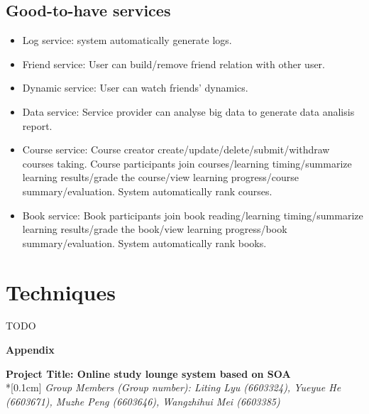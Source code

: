\documentclass[runningheads]{llncs}
\begin{document}
\subsection*{Good-to-have services}
\begin{itemize}
    \item Log service: system automatically generate logs.
    \item Friend service: User can build/remove friend relation with other user.
    \item Dynamic service: User can watch friends' dynamics.
    \item Data service: Service provider can analyse big data to generate data analisis report.
    \item Course service: Course creator create/update/delete/submit/withdraw courses taking. Course participants join courses/learning timing/summarize learning results/grade the course/view learning progress/course summary/evaluation. System automatically rank courses.
    \item Book service: Book participants join book reading/learning timing/summarize learning results/grade the book/view learning progress/book summary/evaluation. System automatically rank books.
    
\end{itemize}

\section*{Techniques}
TODO

\clearpage
\begin{flushleft}
    \huge{\textbf{Appendix}}
    \end{flushleft}
    \begin{center}
    \Large{\textbf{Project Title: Online study lounge system based on SOA }} \\*[0.1cm]%
    \large{\emph{Group Members (Group number): Liting Lyu (6603324), Yueyue  He (6603671), Muzhe Peng (6603646), Wangzhihui Mei (6603385)}} %
    \end{center}
    
    
    \noindent 
\end{document}
